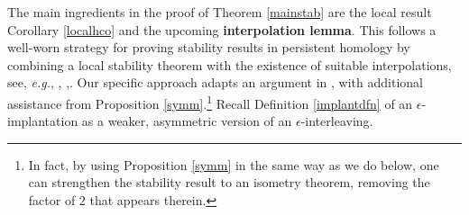 \documentclass[11pt]{amsart}
\theoremstyle{definition}
\theoremstyle{remark}
\numberwithin{equation}{section}
\def\ep{\epsilon}
\begin{document}
The main ingredients in the proof of Theorem \ref{mainstab} are the local result Corollary \ref{localhco} and the upcoming \textbf{interpolation lemma}.  This follows a well-worn strategy for proving stability results in persistent homology by combining a local stability theorem with the existence of suitable interpolations, see, \emph{e.g.}, \cite[Section 3.3]{CEH07}, \cite[Section 5.6]{CDGO},\cite[Section 9]{UZ}.  Our specific approach adapts an argument in \cite{UZ}, with additional assistance from Proposition \ref{symm}.\footnote{In fact, by using Proposition \ref{symm} in the same way as we do below, one can strengthen the  stability result \cite[Theorem 1.4(i)]{UZ} to an isometry theorem, removing the factor of $2$ that appears therein.}  Recall Definition \ref{implantdfn} of an $\ep$-implantation as a weaker, asymmetric version of an $\ep$-interleaving.
\end{document}

